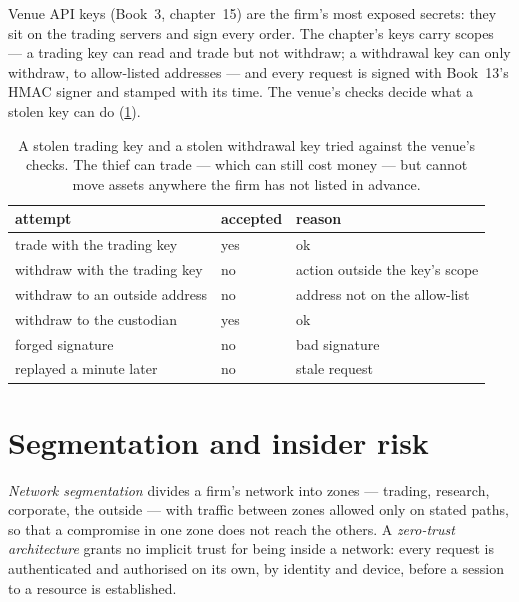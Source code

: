 Venue API keys (Book~3, chapter~15) are the firm's most exposed secrets: they sit on the trading servers and sign every order. The chapter's
keys carry scopes --- a trading key can read and trade but not withdraw; a withdrawal key can only withdraw, to allow-listed addresses --- and
every request is signed with Book~13's HMAC signer and stamped with its time. The venue's checks decide what a stolen key can do
(\cref{tab:pl:security:keys}).

\label{lst:pl:security:verify}

\begin{table}[htbp]
\centering\small
\begin{tabular}{lll}
\toprule
attempt & accepted & reason\\
\midrule
trade with the trading key & yes & ok\\
withdraw with the trading key & no & action outside the key's scope\\
withdraw to an outside address & no & address not on the allow-list\\
withdraw to the custodian & yes & ok\\
forged signature & no & bad signature\\
replayed a minute later & no & stale request\\
\bottomrule
\end{tabular}
\caption{A stolen trading key and a stolen withdrawal key tried against the venue's checks. The thief can trade --- which can still cost money
--- but cannot move assets anywhere the firm has not listed in advance.}\label{tab:pl:security:keys}
\end{table}

\section{Segmentation and insider risk}

\begin{definition}\label{def:pl:security:segmentation}
\emph{Network segmentation} divides a firm's network into zones --- trading, research, corporate, the outside ---
with traffic between zones allowed only on stated paths, so that a compromise in one zone does not reach the others. A \emph{zero-trust
architecture} grants no implicit trust for being inside a network: every request is authenticated and
authorised on its own, by identity and device, before a session to a resource is established.
\end{definition}

